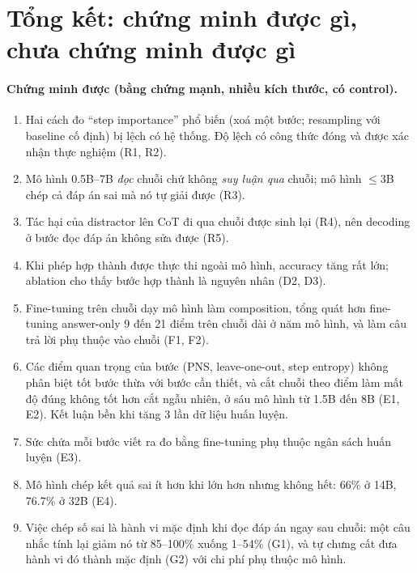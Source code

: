 \documentclass[11pt]{article}
\begin{document}
\section{Tổng kết: chứng minh được gì, chưa chứng minh được gì}

\paragraph{Chứng minh được (bằng chứng mạnh, nhiều kích thước, có control).}
\begin{enumerate}[leftmargin=*,itemsep=1pt]
\item Hai cách đo ``step importance'' phổ biến (xoá một bước; resampling với baseline cố định) bị
  lệch có hệ thống. Độ lệch có công thức đóng và được xác nhận thực nghiệm (R1, R2).
\item Mô hình 0.5B--7B \emph{đọc} chuỗi chứ không \emph{suy luận qua} chuỗi; mô hình $\le$3B chép cả
  đáp án sai mà nó tự giải được (R3).
\item Tác hại của distractor lên CoT đi qua chuỗi được sinh lại (R4), nên decoding ở bước đọc đáp án
  không sửa được (R5).
\item Khi phép hợp thành được thực thi ngoài mô hình, accuracy tăng rất lớn; ablation cho thấy bước
  hợp thành là nguyên nhân (D2, D3).
\item Fine-tuning trên chuỗi dạy mô hình làm composition, tổng quát hơn fine-tuning answer-only 9 đến 21
  điểm trên chuỗi dài ở năm mô hình, và làm câu trả lời phụ thuộc vào chuỗi (F1, F2).
\item Các điểm quan trọng của bước (PNS, leave-one-out, step entropy) không phân biệt tốt bước thừa với
  bước cần thiết, và cắt chuỗi theo điểm làm mất độ đúng không tốt hơn cắt ngẫu nhiên, ở sáu mô hình từ
  1.5B đến 8B (E1, E2). Kết luận bền khi tăng 3 lần dữ liệu huấn luyện.
\item Sức chứa mỗi bước viết ra đo bằng fine-tuning phụ thuộc ngân sách huấn luyện (E3).
\item Mô hình chép kết quả sai ít hơn khi lớn hơn nhưng không hết: 66\% ở 14B, 76.7\% ở 32B (E4).
\item Việc chép số sai là hành vi mặc định khi đọc đáp án ngay sau chuỗi: một câu nhắc tính lại giảm nó từ
  85--100\% xuống 1--54\% (G1), và tự chưng cất đưa hành vi đó thành mặc định (G2) với chi phí phụ thuộc mô hình.
\end{enumerate}
\end{document}
